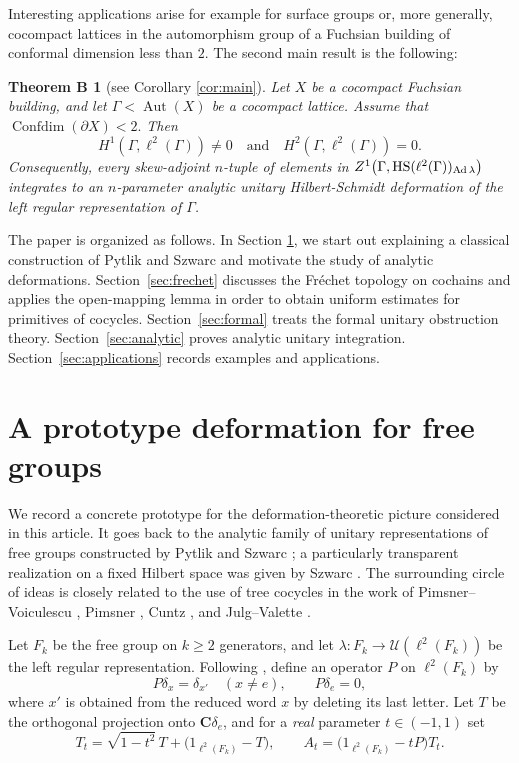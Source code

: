 \documentclass[12pt]{amsproc}
\theoremstyle{plain}
\newtheorem*{theoremB}{Theorem B}
\theoremstyle{definition}
\numberwithin{equation}{section}
\newcommand{\HS}{{\rm HS}}
\DeclareMathOperator{\Ad}{Ad}
\DeclareMathOperator{\Aut}{Aut}
\DeclareMathOperator{\Confdim}{Confdim}
\begin{document}
Interesting applications arise for example for surface groups or, more generally, cocompact lattices in the automorphism group of a Fuchsian building of conformal dimension less than $2$. The second main result is the following:

\begin{theoremB}[see Corollary \ref{cor:main}]
Let $X$ be a cocompact Fuchsian building, and let
$\Gamma<\Aut(X)$ be a cocompact lattice. Assume that
$
\Confdim(\partial X)<2.
$
Then
$$H^1(\Gamma,\ell^2(\Gamma)) \neq 0 \quad\text{and}\quad H^2(\Gamma,\ell^2(\Gamma))=0.$$
Consequently, every skew-adjoint $n$-tuple of elements in
$
Z^1\bigl(\Gamma,\HS(\ell^2(\Gamma))_{\Ad\lambda}\bigr)
$
integrates to an $n$-parameter analytic unitary Hilbert-Schmidt
deformation of the left regular representation of $\Gamma$.
\end{theoremB}

The paper is organized as follows. In Section \ref{sec:motivation}, we start out explaining a classical construction of Pytlik and Szwarc \cite{PS86} and motivate the study of analytic deformations. Section~\ref{sec:frechet} discusses the Fr\'echet topology on cochains and applies the open-mapping lemma in order to obtain uniform estimates for primitives of cocycles. Section~\ref{sec:formal} treats the formal unitary obstruction theory. Section~\ref{sec:analytic} proves analytic unitary integration. Section~\ref{sec:applications} records examples and applications.

\section{A prototype deformation for free groups}
\label{sec:motivation}

We record a concrete prototype for the deformation-theoretic picture considered in this article.
It goes back to the analytic family of unitary representations of free groups constructed by Pytlik and Szwarc \cite{PS86}; a particularly transparent realization on a fixed Hilbert space was given by Szwarc \cite{Sz88}.
The surrounding circle of ideas is closely related to the use of tree cocycles in the work of Pimsner--Voiculescu \cite{PV82}, Pimsner \cite{Pi87}, Cuntz \cite{Cu83}, and Julg--Valette \cite{JV84}.

Let $F_k$ be the free group on $k\ge 2$ generators, and let
$
\lambda \colon F_k \to \mathcal U(\ell^2(F_k))
$
be the left regular representation.
Following \cite{Sz88}, define an operator $P$ on $\ell^2(F_k)$ by
\[
P\delta_x=\delta_{x'} \quad (x\neq e), \qquad P\delta_e=0,
\]
where $x'$ is obtained from the reduced word $x$ by deleting its last letter.
Let $T$ be the orthogonal projection onto $\mathbf C\delta_e$, and for a \emph{real} parameter $t \in (-1,1)$ set
\[
T_t=\sqrt{1-t^2}\,T+\bigl(1_{\ell^2(F_k)}-T\bigr), \qquad A_t=\bigl(1_{\ell^2(F_k)}-tP\bigr)T_t.
\]
\end{document}
